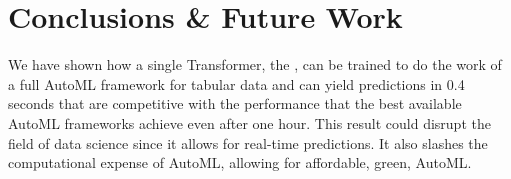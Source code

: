 \documentclass{article}
\begin{document}





\section{Conclusions \& Future Work}
We have shown how a single Transformer, the \methodname{}, can be trained to do the work of a full AutoML framework for tabular data and can yield predictions in 0.4 seconds that are competitive with the performance that the best available AutoML frameworks achieve even after one hour.
This result could disrupt the field of data science since it allows for real-time predictions. It also slashes the computational expense of AutoML, allowing for affordable, green, AutoML.
\end{document}
